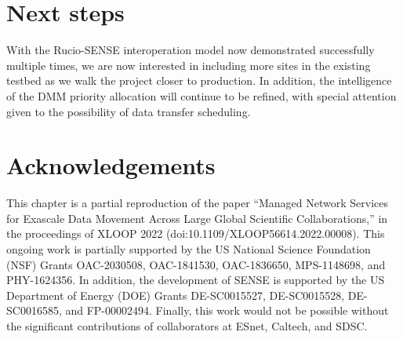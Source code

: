 \section{Next steps}
With the Rucio-SENSE interoperation model now demonstrated successfully multiple times, we are now interested in including more sites in the existing testbed as we walk the project closer to production. 
In addition, the intelligence of the DMM priority allocation will continue to be refined, with special attention given to the possibility of data transfer scheduling. 

\section{Acknowledgements}
This chapter is a partial reproduction of the paper ``Managed Network Services for Exascale Data Movement Across Large Global Scientific Collaborations,'' in the proceedings of XLOOP 2022 (doi:10.1109/XLOOP56614.2022.00008). 
This ongoing work is partially supported by the US National Science Foundation (NSF) Grants OAC-2030508, OAC-1841530, OAC-1836650, MPS-1148698, and PHY-1624356. 
In addition, the development of SENSE is supported by the US Department of Energy (DOE) Grants DE-SC0015527, DE-SC0015528, DE-SC0016585, and FP-00002494. 
Finally, this work would not be possible without the significant contributions of collaborators at ESnet, Caltech, and SDSC.
